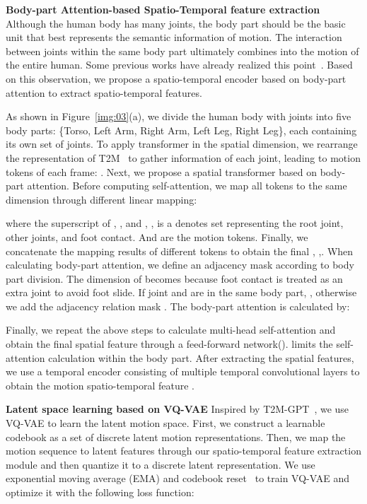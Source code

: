 \documentclass[10pt,twocolumn,letterpaper]{article}
\begin{document}
\textbf{Body-part Attention-based Spatio-Temporal feature extraction}\quad
Although the human body has many joints, the body part should be the basic unit that best represents the semantic information of motion. The interaction between joints within the same body part ultimately combines into the motion of the entire human. Some previous works have already realized this point~\cite{jang2022motion,aberman2020skeleton,hu2023pose}. Based on this observation, we propose a spatio-temporal encoder based on body-part attention to extract spatio-temporal features.

As shown in Figure~\ref{img:03}(a), we divide the human body with  joints into five body parts: \{Torso, Left Arm, Right Arm, Left Leg, Right Leg\}, each containing its own set of joints. To apply transformer in the spatial dimension, we rearrange the representation of T2M~\cite{guo2022generating} to gather information of each joint, leading to  motion tokens of each frame: . Next, we propose a spatial transformer  based on body-part attention. Before computing self-attention, we map all tokens to the same dimension through different linear mapping:

where the superscript  of , ,  and , ,  is a denotes set representing the root joint, other joints, and foot contact. And  are the motion tokens. Finally, we concatenate the mapping results of different tokens to obtain the final , ,. When calculating body-part attention, we define an adjacency mask  according to body part division. The dimension of  becomes  because foot contact  is treated as an extra joint to avoid foot slide. If joint  and  are in the same body part, , otherwise we add the adjacency relation mask . The body-part attention is calculated by:



Finally, we repeat the above steps to calculate multi-head self-attention and obtain the final spatial feature  through a feed-forward network().  limits the self-attention calculation within the body part. After extracting the spatial features, we use a temporal encoder  consisting of multiple temporal convolutional layers to obtain the motion spatio-temporal feature .


\textbf{Latent space learning based on VQ-VAE}\quad
Inspired by T2M-GPT~\cite{zhang2023t2m}, we use VQ-VAE to learn the latent motion space. First, we construct a learnable codebook  as a set of discrete latent motion representations. Then, we map the motion sequence  to latent features  through our spatio-temporal feature extraction module and then quantize it to a discrete latent representation. We use exponential moving average (EMA) and codebook reset~\cite{williams2020hierarchical} to train VQ-VAE and optimize it with the following loss function:
\end{document}
